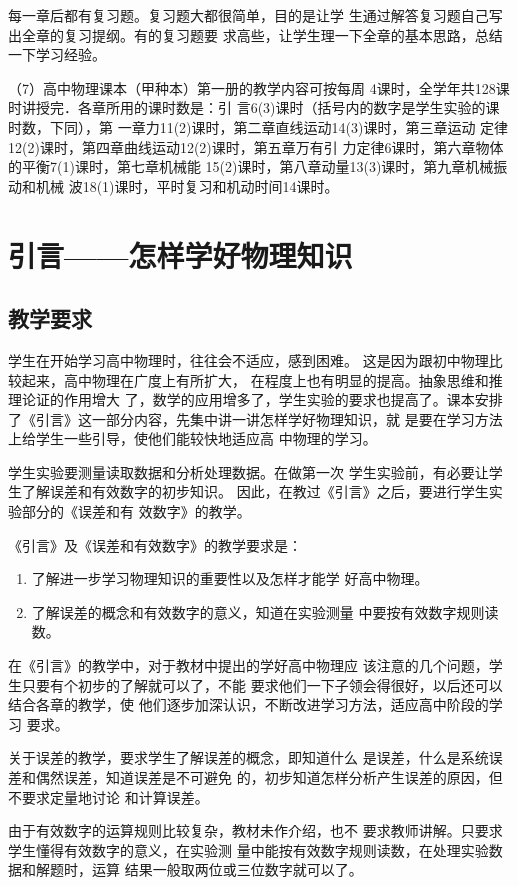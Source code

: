 每一章后都有复习题。复习题大都很简单，目的是让学
生通过解答复习题自己写出全章的复习提纲。有的复习题要
求高些，让学生理一下全章的基本思路，总结一下学习经验。

（7）高中物理课本（甲种本）第一册的教学内容可按每周
4课时，全学年共128课时讲授完．各章所用的课时数是：引
言6(3)课时（括号内的数字是学生实验的课时数，下同），第
一章力11(2)课时，第二章直线运动14(3)课时，第三章运动
定律12(2)课时，第四章曲线运动12(2)课时，第五章万有引
力定律6课时，第六章物体的平衡7(1)课时，第七章机械能
15(2)课时，第八章动量13(3)课时，第九章机械振动和机械
波18(1)课时，平时复习和机动时间14课时。

\chapter{引言——怎样学好物理知识}

\section{教学要求}
学生在开始学习高中物理时，往往会不适应，感到困难。
这是因为跟初中物理比较起来，高中物理在广度上有所扩大，
在程度上也有明显的提高。抽象思维和推理论证的作用增大
了，数学的应用增多了，学生实验的要求也提高了。课本安排
了《引言》这一部分内容，先集中讲一讲怎样学好物理知识，就
是要在学习方法上给学生一些引导，使他们能较快地适应高
中物理的学习。

学生实验要测量读取数据和分析处理数据。在做第一次
学生实验前，有必要让学生了解误差和有效数字的初步知识。
因此，在教过《引言》之后，要进行学生实验部分的《误差和有
效数字》的教学。

《引言》及《误差和有效数字》的教学要求是：
\begin{enumerate}
    \item 了解进一步学习物理知识的重要性以及怎样才能学
好高中物理。
\item 了解误差的概念和有效数字的意义，知道在实验测量
中要按有效数字规则读数。
\end{enumerate}

在《引言》的教学中，对于教材中提出的学好高中物理应
该注意的几个问题，学生只要有个初步的了解就可以了，不能
要求他们一下子领会得很好，以后还可以结合各章的教学，使
他们逐步加深认识，不断改进学习方法，适应高中阶段的学习
要求。

关于误差的教学，要求学生了解误差的概念，即知道什么
是误差，什么是系统误差和偶然误差，知道误差是不可避免
的，初步知道怎样分析产生误差的原因，但不要求定量地讨论
和计算误差。

由于有效数字的运算规则比较复杂，教材未作介绍，也不
要求教师讲解。只要求学生懂得有效数字的意义，在实验测
量中能按有效数字规则读数，在处理实验数据和解题时，运算
结果一般取两位或三位数字就可以了。

